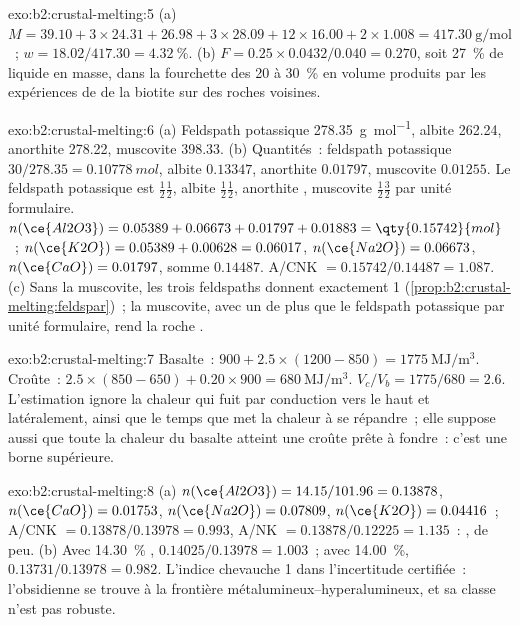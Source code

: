 \begin{solution}{exo:b2:crustal-melting:5}
(a) $M = 39.10 + 3\times24.31 + 26.98 + 3\times28.09 + 12\times16.00 + 2\times1.008 =
\qty{417.30}{\gram\per\mole}$~; $w = 18.02/417.30 = \qty{4.32}{\percent}$.
(b) $F = 0.25\times0.0432/0.040 = 0.270$, soit \qty{27}{\percent} de liquide en masse, dans la fourchette des
20 à \qty{30}{\percent} en volume produits par les expériences de  de la biotite sur des
roches voisines.
\end{solution}

\begin{solution}{exo:b2:crustal-melting:6}
(a) Feldspath potassique \qty{278.35}{\gram\per\mole}, albite 262.24, anorthite 278.22, muscovite
398.33. (b) Quantités~: feldspath potassique $30/278.35 = \qty{0.10778}{mol}$, albite $0.13347$,
anorthite $0.01797$, muscovite $0.01255$. Le feldspath potassique est $\tfrac12$$\tfrac12$,
albite $\tfrac12$$\tfrac12$, anorthite , muscovite
$\tfrac12$$\tfrac32$ par unité formulaire. $n(\ce{Al2O3}) = 0.05389 +
0.06673 + 0.01797 + 0.01883 = \qty{0.15742}{mol}$~; $n(\ce{K2O}) = 0.05389 + 0.00628 =
0.06017$, $n(\ce{Na2O}) = 0.06673$, $n(\ce{CaO}) = 0.01797$, somme $0.14487$.
A/CNK $= 0.15742/0.14487 = 1.087$. (c) Sans la muscovite, les trois feldspaths donnent
exactement 1 (\cref{prop:b2:crustal-melting:feldspar})~; la muscovite, avec un  de plus que le
feldspath potassique par unité formulaire, rend la roche .
\end{solution}

\begin{solution}{exo:b2:crustal-melting:7}
Basalte~: $900 + 2.5\times(1200 - 850) = \qty{1775}{\mega\joule\per\cubic\metre}$. Croûte~:
$2.5\times(850 - 650) + 0.20\times900 = \qty{680}{\mega\joule\per\cubic\metre}$.
$V_c/V_b = 1775/680 = 2.6$. L'estimation ignore la chaleur qui fuit par conduction
vers le haut et latéralement, ainsi que le temps que met la chaleur à se répandre~; elle suppose aussi que toute
la chaleur du basalte atteint une croûte prête à fondre~: c'est une borne supérieure.
\end{solution}

\begin{solution}{exo:b2:crustal-melting:8}
(a) $n(\ce{Al2O3}) = 14.15/101.96 = 0.13878$, $n(\ce{CaO}) = 0.01753$, $n(\ce{Na2O}) =
0.07809$, $n(\ce{K2O}) = 0.04416$~; A/CNK $= 0.13878/0.13978 = 0.993$, A/NK $=
0.13878/0.12225 = 1.135$~: , de peu. (b) Avec \qty{14.30}{\percent} ,
$0.14025/0.13978 = 1.003$~; avec \qty{14.00}{\percent}, $0.13731/0.13978 = 0.982$. L'indice
chevauche 1 dans l'incertitude certifiée~: l'obsidienne se trouve à la frontière métalumineux--hyperalumineux,
et sa classe n'est pas robuste.
\end{solution}

